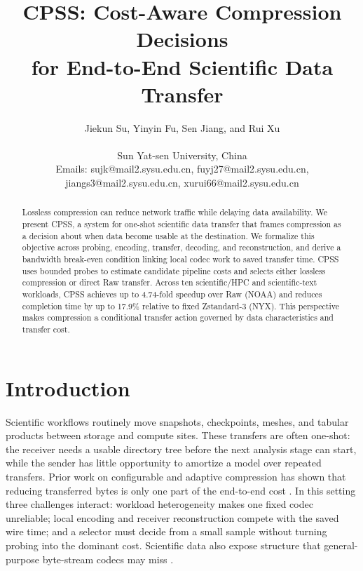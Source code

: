 \documentclass[smallabstract,smallcaptions]{dccpaper}
\renewcommand{\Section}[1]{\vspace*{-0.05in}\section{#1}\vspace{0.025in}}
\begin{document}
\title{\textbf{CPSS: Cost-Aware Compression Decisions\\for End-to-End Scientific Data Transfer}}

\author{%
Jiekun Su, Yinyin Fu, Sen Jiang, and Rui Xu\\[0.5em]
{\small\begin{minipage}{0.96\linewidth}\centering
Sun Yat-sen University, China\\
Emails: sujk@mail2.sysu.edu.cn, fuyj27@mail2.sysu.edu.cn, jiangs3@mail2.sysu.edu.cn, xurui66@mail2.sysu.edu.cn
\end{minipage}}
}

\maketitle
\thispagestyle{empty}

\begin{abstract}
Lossless compression can reduce network traffic while delaying data availability. We present CPSS, a system for one-shot scientific data transfer that frames compression as a decision about when data become usable at the destination. We formalize this objective across probing, encoding, transfer, decoding, and reconstruction, and derive a bandwidth break-even condition linking local codec work to saved transfer time. CPSS uses bounded probes to estimate candidate pipeline costs and selects either lossless compression or direct Raw transfer. Across ten scientific/HPC and scientific-text workloads, CPSS achieves up to 4.74-fold speedup over Raw (NOAA) and reduces completion time by up to 17.9\% relative to fixed Zstandard-3 (NYX). This perspective makes compression a conditional transfer action governed by data characteristics and transfer cost.
\end{abstract}

\Section{Introduction}

Scientific workflows routinely move snapshots, checkpoints, meshes, and tabular products between storage and compute sites. These transfers are often one-shot: the receiver needs a usable directory tree before the next analysis stage can start, while the sender has little opportunity to amortize a model over repeated transfers. Prior work on configurable and adaptive compression has shown that reducing transferred bytes is only one part of the end-to-end cost \cite{krintz2001,wiseman2004,knutsson1999}. In this setting three challenges interact: workload heterogeneity makes one fixed codec unreliable; local encoding and receiver reconstruction compete with the saved wire time; and a selector must decide from a small sample without turning probing into the dominant cost. Scientific data also expose structure that general-purpose byte-stream codecs may miss \cite{burtscher2009,lindstrom2006,zfp2014}.
\end{document}
